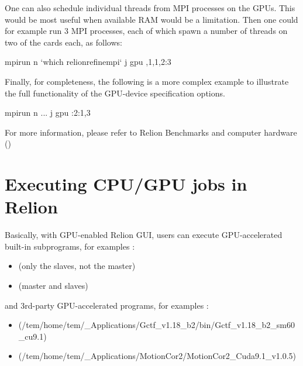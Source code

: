 \documentclass[letterpaper,10pt,english]{sphinxmanual}
\begin{document}
One can also schedule individual threads from MPI processes on the GPUs. This would be most useful when available RAM would be a limitation. Then one could for example run 3 MPI processes, each of which spawn a number of threads on two of the cards each, as follows:

\begin{sphinxVerbatim}[commandchars=\\\{\}]
mpirun \PYGZhy{}n  ‘which relion\PYGZus{}refine\PYGZus{}mpi‘ \PYGZhy{}\PYGZhy{}j  \PYGZhy{}\PYGZhy{}gpu ,1,1,2:3
\end{sphinxVerbatim}

Finally, for completeness, the following is a more complex example to illustrate the full functionality of the GPU-device specification options.

\begin{sphinxVerbatim}[commandchars=\\\{\}]
mpirun \PYGZhy{}n  ... \PYGZhy{}j  \PYGZhy{}\PYGZhy{}gpu :2:1,3
\end{sphinxVerbatim}

For more information, please refer to Relion Benchmarks and computer hardware ()


\section{Executing CPU/GPU jobs in Relion}
\label{\detokenize{relion:executing-cpu-gpu-jobs-in-relion}}
Basically, with GPU-enabled Relion GUI, users can execute GPU-accelerated built-in subprograms, for examples :
\begin{itemize}
\item {} 
 (only the slaves, not the master)

\item {} 
 (master and slaves)

\end{itemize}

and 3rd-party GPU-accelerated programs, for examples :
\begin{itemize}
\item {} 
 (/tem/home/tem/\_Applications/Gctf\_v1.18\_b2/bin/Gctf\_v1.18\_b2\_sm60\_cu9.1)

\item {} 
 (/tem/home/tem/\_Applications/MotionCor2/MotionCor2\_Cuda9.1\_v1.0.5)

\end{itemize}
\end{document}
